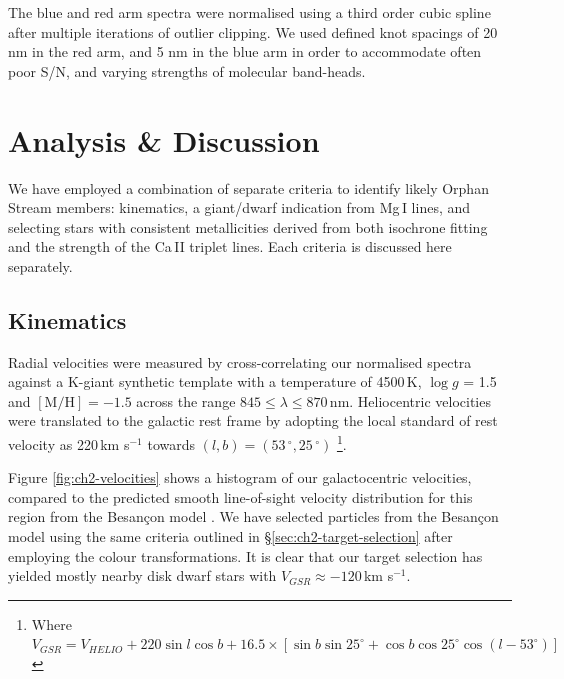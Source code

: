 The blue and red arm spectra were normalised using a third order cubic spline after multiple iterations of outlier clipping. We used defined knot spacings of 20 nm in the red arm, and 5 nm in the blue arm in order to accommodate often poor S/N, and varying strengths of molecular band-heads.

\section{Analysis \& Discussion}
\label{sec:ch2-analysis}

We have employed a combination of separate criteria to identify likely Orphan Stream members: kinematics, a giant/dwarf indication from Mg\,\textsc{I} lines, and selecting stars with consistent metallicities derived from both isochrone fitting and the strength of the Ca\,\textsc{II} triplet lines. Each criteria is discussed here separately.

\subsection{Kinematics}
Radial velocities were measured by cross-correlating our normalised spectra against a K-giant synthetic template with a temperature of 4500\,K, $\log{g}$ = 1.5 and $[\mbox{M/H}] = -1.5$ across the range $845 \leq \lambda \leq 870$\,nm. Heliocentric velocities were translated to the galactic rest frame by adopting the local standard of rest velocity as 220\,km s$^{-1}$ towards $(l, b) = (53\,^\circ, 25\,^\circ)$ \citep{Kerr_Lynden-Bell_1986, Mihalas_Binney_1981}\footnote{Where $V_{GSR} = V_{HELIO} + 220\sin{l}\cos{b} + 16.5\times[\sin{b}\sin{25^\circ} + \cos{b}\cos{25^\circ}\cos{(l - 53^\circ)}]$}.

Figure \ref{fig:ch2-velocities} shows a histogram of our galactocentric velocities, compared to the predicted smooth line-of-sight velocity distribution for this region from the Besan\c{c}on model \citep{Robin_et-al_2003}. We have selected particles from the Besan\c{c}on model using the same criteria outlined in \S\ref{sec:ch2-target-selection} after employing the \citet{Jordi_et-al_2006} colour transformations. It is clear that our target selection has yielded mostly nearby disk dwarf stars with $V_{GSR} \approx -120$\,km s$^{-1}$.

